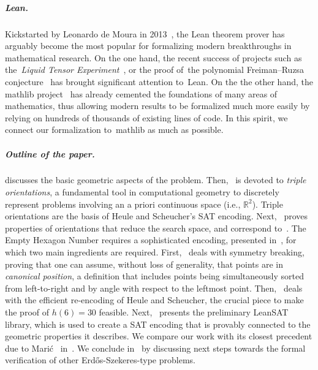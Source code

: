 \subparagraph*{Lean.} Kickstarted by Leonardo de Moura in 2013~\cite{demouraLeanTheoremProver2015}, the Lean theorem prover has arguably become the most popular for formalizing modern breakthroughs in mathematical research.
On the one hand, the recent success of projects such as the~\emph{Liquid Tensor Experiment}~\cite{Castelvecchi2021}, or the proof of~the polynomial Freiman–Ruzsa conjecture~\cite{gowers2023conjecture, slomanATeamMathProves2023} has brought significant attention to~Lean. %
On the the other hand, the \textsf{mathlib} project~\cite{The_mathlib_Community_2020} has already cemented the foundations of many areas of mathematics, thus allowing modern results to be formalized much more easily by relying on hundreds of thousands of existing lines of code. In this spirit, we connect our formalization to~\textsf{mathlib} as much as possible.

\subparagraph*{Outline of the paper.}
 discusses the basic geometric aspects of the problem.  Then,~ is devoted to \emph{triple orientations}, a fundamental tool in computational geometry to discretely represent problems involving an a priori continuous space (i.e., $\mathbb{R}^2$).
 Triple orientations are the basis of Heule and Scheucher's SAT encoding.
 Next,~ proves properties of orientations that reduce the search space,
and correspond to~.
The Empty Hexagon Number requires a sophisticated encoding, presented in~, for which two main ingredients are required. First,~ deals with symmetry breaking, proving that one can assume, without loss of generality, that points are in \emph{canonical position}, a definition that includes points being simultaneously sorted from left-to-right and by angle with respect to the leftmost point.
Then,~ deals with the efficient re-encoding of Heule and Scheucher, the crucial piece to make the proof of $h(6) = 30$ feasible. Next,~ presents the preliminary \textsf{LeanSAT} library, which is used to create a SAT encoding that is provably connected to the geometric properties it describes. We compare our work with its closest precedent due to Marić~\cite{19maric_fast_formal_proof_erdos_szekeres_conjecture_convex_polygons_most_six_points} in~. We conclude in~ by discussing next steps towards the formal verification of other Erd\H{o}s-Szekeres-type problems.

